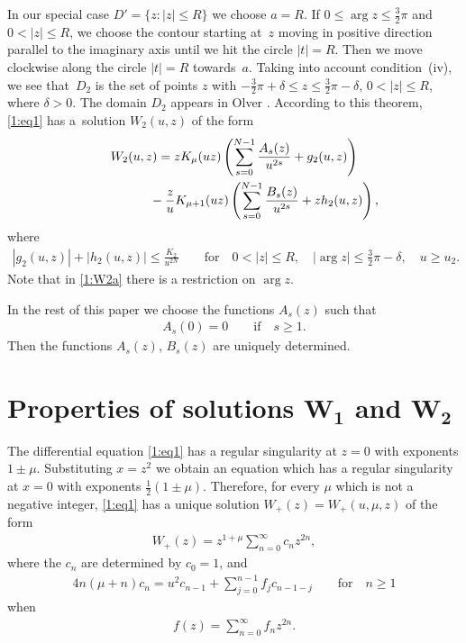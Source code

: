 In our special case $D'=\{z\colon |z|\le R\}$ we choose $a=R$. If $0\le\arg z\le \frac32\pi$ and $0<|z|\le R$, we choose the contour starting at~$z$
moving in positive direction parallel to the imaginary axis until we hit the circle $|t|=R$. Then we move clockwise along the circle $|t|=R$ towards~$a$. Taking into account condition~(iv), we see that~$D_2$ is the set of points $z$ with $-\frac32\pi+\delta\le z\le \frac32\pi-\delta$,
$0<|z|\le R$, where $\delta>0$.
The domain $D_2$ appears in Olver \cite[Theorem~D(ii)]{O}. According to this theorem, \eqref{1:eq1} has a~solution $W_2(u,z)$ of the form
\begin{gather}
W_2(u,z)=zK_\mu(uz)\left(\sum_{s=0}^{N-1} \frac{A_s(z)}{u^{2s}}+g_2(u,z)\right)\nonumber\\
\hphantom{W_2(u,z)=}{} -\frac{z}{u}K_{\mu+1}(uz)\left(\sum_{s=0}^{N-1} \frac{B_s(z)}{u^{2s}}+zh_2(u,z)\right),\label{1:W2}
\end{gather}
where
\begin{gather}\label{1:W2a}
 |g_2(u,z)|+|h_2(u,z)|\le \frac{K_2}{u^{2N}}\qquad \text{for} \quad 0<|z|\le R, \quad |\arg z|\le \frac32\pi-\delta, \quad u\ge u_2 .
\end{gather}
Note that in \eqref{1:W2a} there is a restriction on $\arg z$.

In the rest of this paper we choose the functions $A_s(z)$ such that
\begin{gather}\label{1:As}
A_s(0)=0\qquad\text{if} \quad s\ge 1.
\end{gather}
Then the functions $A_s(z)$, $B_s(z)$ are uniquely determined.

\section[Properties of solutions $W_1$ and $W_2$]{Properties of solutions $\boldsymbol{W_1}$ and $\boldsymbol{W_2}$}\label{discussion}

The dif\/ferential equation \eqref{1:eq1} has a regular singularity at $z=0$ with exponents $1\pm \mu$.
Substituting $x=z^2$ we obtain an equation which has a regular singularity at $x=0$ with exponents $\frac12(1\pm\mu)$.
Therefore, for every $\mu$ which is not a negative integer, \eqref{1:eq1} has a unique solution $W_+(z)=W_+(u,\mu,z)$ of the form
\begin{gather*}%
W_+(z)= z^{1+\mu}\sum_{n=0}^\infty c_nz^{2n},
\end{gather*}
where the $c_n$ are determined by $c_0=1$, and
\begin{gather*}
4n(\mu+n)c_n=u^2c_{n-1}+\sum_{j=0}^{n-1}f_jc_{n-1-j} \qquad\text{for} \quad n\ge 1
\end{gather*}
when
\begin{gather*}
f(z)=\sum_{n=0}^\infty f_n z^{2n} .
\end{gather*}

